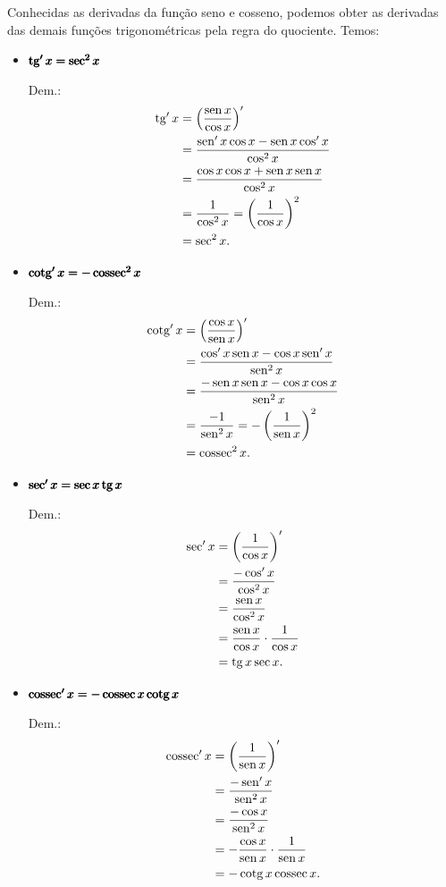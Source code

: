 Conhecidas as derivadas da função seno e cosseno, podemos obter as derivadas das demais funções trigonométricas pela regra do quociente. Temos:
\begin{itemize}
\item $\pmb{\operatorname{tg}' x = \sec^2 x}$

  Dem.:
  \begin{align}
    \operatorname{tg} ' x &= \left(\frac{\operatorname{sen} x}{\cos x}\right)'\\
            &= \frac{\operatorname{sen}' x\cos x - \operatorname{sen} x\cos' x}{\cos^2 x} \\
            &= \frac{\cos x\cos x + \operatorname{sen} x\operatorname{sen} x}{\cos^2 x} \\
            &= \frac{1}{\cos^2 x} = \left(\frac{1}{\cos x}\right)^2 \\
            &= \sec^2 x.
  \end{align}

\item $\pmb{\operatorname{cotg}' x = -\operatorname{cossec}^2 x}$

  Dem.:
  \begin{align}
    \operatorname{cotg} ' x &= \left(\frac{\cos x}{\operatorname{sen} x}\right)'\\
            &= \frac{\cos' x\operatorname{sen} x - \cos x\operatorname{sen}' x}{\operatorname{sen}^2 x} \\
            &= \frac{-\operatorname{sen} x\operatorname{sen} x - \cos x\cos x}{\operatorname{sen}^2 x} \\
            &= \frac{-1}{\operatorname{sen}^2 x} = -\left(\frac{1}{\operatorname{sen} x}\right)^2 \\
            &= \operatorname{cossec}^2 x.
  \end{align}

\item $\pmb{\sec' x = \sec x\operatorname{tg} x}$

  Dem.:
  \begin{align}
    \sec ' x &= \left(\frac{1}{\cos x}\right)'\\
            &= \frac{-\cos' x}{\cos^2 x} \\
            &= \frac{\operatorname{sen} x}{\cos^2 x} \\
            &= \frac{\operatorname{sen} x}{\cos x}\cdot \frac{1}{\cos x} \\
            &= \operatorname{tg} x\sec x.
  \end{align}

\item $\pmb{\operatorname{cossec}' x = -\operatorname{cossec} x\operatorname{cotg} x}$

  Dem.:
  \begin{align}
    \operatorname{cossec} ' x &= \left(\frac{1}{\operatorname{sen} x}\right)'\\
            &= \frac{-\operatorname{sen}' x}{\operatorname{sen}^2 x} \\
            &= \frac{-\cos x}{\operatorname{sen}^2 x} \\
            &= -\frac{\cos x}{\operatorname{sen} x}\cdot \frac{1}{\operatorname{sen} x} \\
            &= -\operatorname{cotg} x\operatorname{cossec} x.
  \end{align}
\end{itemize}

